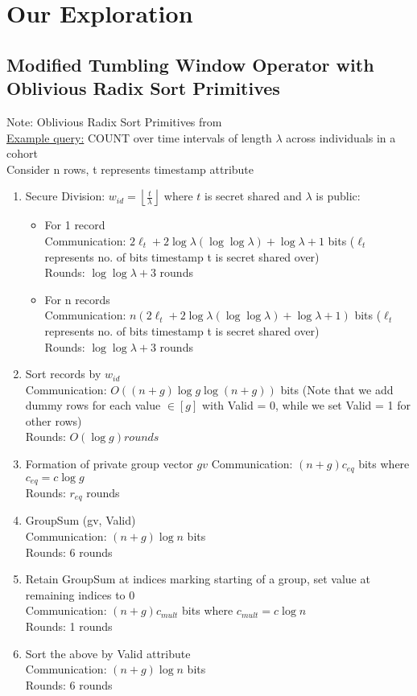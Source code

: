 \documentclass{article}
\begin{document}
\section{Our Exploration}

\subsection{Modified Tumbling Window Operator with Oblivious Radix Sort Primitives}
Note: Oblivious Radix Sort Primitives from \cite{Ha22} \\
\underline{Example query:} COUNT over time intervals of length $\lambda$ across individuals in a cohort \\
Consider n rows, t represents timestamp attribute 
\begin{enumerate}
\item Secure Division: $w_{id} = \left\lfloor \frac{t}{\lambda} \right\rfloor$ where $t$ is secret shared and $\lambda$ is public:
\begin{itemize}
\item For 1 record \\
Communication: $2\ell_{t} + 2\log \lambda (\log \log \lambda) + \log \lambda + 1$ bits ($\ell_{t}$ represents no. of bits timestamp t is secret shared over) \\
Rounds: $\log \log \lambda + 3$ rounds
\item For n records \\
Communication: $n(2\ell_{t} + 2\log \lambda (\log \log \lambda) + \log \lambda + 1)$ bits ($\ell_{t}$ represents no. of bits timestamp t is secret shared over) \\
Rounds: $\log \log \lambda + 3$ rounds
\end{itemize}
\item Sort records by $w_{id}$ \\
Communication: $O((n+g) \log g \log (n+g))$ bits (Note that we add dummy rows for each value $\in [g]$ with Valid = 0, while we set Valid = 1 for other rows) \\
Rounds: $O(\log g) rounds$
\item Formation of private group vector $gv$
Communication: $(n+g) c_{eq}$ bits where $c_{eq} = c \log g$ \\
Rounds: $r_{eq}$ rounds
\item GroupSum (gv, Valid)  \\
Communication: $(n+g) \log n$ bits \\
Rounds: 6 rounds
\item Retain GroupSum at indices marking starting of a group, set value at remaining indices to 0 \\
Communication: $(n+g) c_{mult}$ bits where $c_{mult} = c \log n$\\
Rounds: 1 rounds
\item Sort the above by Valid attribute \\
Communication: $(n+g) \log n$ bits \\
Rounds: 6 rounds
\end{enumerate}
\end{document}
